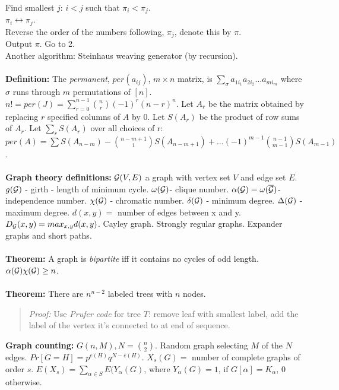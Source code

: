 \jt Find smallest $j$: $i<j$ such that $\pi_i < \pi_j$.\\
\jt $\pi_i \leftrightarrow \pi_j$.\\
\jt Reverse the order of the numbers following, $\pi_j$, denote this
by $\pi$.\\
\jt Output $\pi$.  Go to 2.\\
Another algorithm: Steinhaus weaving generator (by recursion).
\\
\\
{\bf Definition:}  
The \emph{permanent}, $per( a_{ij} )$, $m \times n$ matrix, is
$\sum_{\sigma} a_{1 i_1} a_{2 i_2} \ldots a_{m i_m}$ where
$\sigma$ runs through $m$ permutations of $[n]$.
$ n!= per(J) = \sum_{r=0}^{n-1} {n \choose r} (-1)^{r} (n-r)^{n}$.
Let $A_r$ be the matrix obtained by replacing $r$ specified
columns of $A$ by $0$.  Let $S(A_r )$ be the product of row sums of
$A_r$.  Let $\sum_r S(A_r )$ over all choices of r:
$ per(A)= \sum S(A_{n-m}) - {n-m+1 \choose 1} S(A_{n-m+1}) +
\ldots (-1)^{m-1} {n-1 \choose m-1} S(A_{m-1}) $.  \\
\\
{\bf Graph theory definitions:}  
${\cal G}(V,E)$ a graph with vertex set $V$ and edge set $E$.
$g({\cal G})$ - girth - length of minimum cycle.
$\omega ({\cal G})$- clique number.
$\alpha ({\cal G})= \omega (\overline {{\cal G}})$- independence number.
$\chi ({\cal G})$ - chromatic number.
$\delta({\cal G})$ - minimum degree.
$\Delta ({\cal G})$ - maximum degree.
$d (x,y)= $ number of edges between x and y.
$D_{\cal G} (x,y)= max_{x, y} d(x, y)$.
Cayley graph.  Strongly regular graphs. Expander graphs and short paths.
\\
\\
{\bf Theorem:}
A graph is \emph{bipartite} iff it contains no cycles of odd length.
$\alpha ({\cal G}) \chi ({\cal G}) \geq n$.
\\
\\
{\bf Theorem:} There are $n^{n-2}$ labeled trees with $n$ nodes.  
\begin{quote}
\emph{Proof:} Use \emph{Prufer code} for tree $T$: remove leaf with smallest
label, add the label of the vertex it's connected to at end of sequence.
\end{quote}
{\bf Graph counting:}
$G(n, M), N= {n \choose 2}$.  Random graph selecting  $M$ of the $N$ edges.
$Pr[G=H]= p^{e(H)} q^{N-e(H)}$.
$X_s (G)= $ number of complete graphs of order $s$.
$E(X_s )=  \sum_{\alpha \in S}  E( Y_{\alpha} (G)$, where
$Y_{\alpha} (G) = 1$, if $G[ \alpha ] = K_{\alpha}$, $0$ otherwise.
